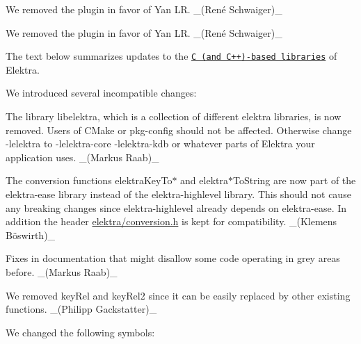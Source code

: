 \begin{DoxyItemize}
\item We removed the plugin in favor of Yan LR. \+\_\+(René Schwaiger)\+\_\+
\end{DoxyItemize}


\begin{DoxyItemize}
\item We removed the plugin in favor of Yan LR. \+\_\+(René Schwaiger)\+\_\+
\end{DoxyItemize}

The text below summarizes updates to the \href{https://www.libelektra.org/libraries/readme}{\tt C (and C++)-\/based libraries} of Elektra.

We introduced several incompatible changes\+:


\begin{DoxyItemize}
\item The library {\ttfamily libelektra}, which is a collection of different elektra libraries, is now removed. Users of C\+Make or pkg-\/config should not be affected. Otherwise change {\ttfamily -\/lelektra} to {\ttfamily -\/lelektra-\/core -\/lelektra-\/kdb} or whatever parts of Elektra your application uses. \+\_\+(\+Markus Raab)\+\_\+
\item The conversion functions {\ttfamily elektra\+Key\+To$\ast$} and {\ttfamily elektra$\ast$\+To\+String} are now part of the {\ttfamily elektra-\/ease} library instead of the {\ttfamily elektra-\/highlevel} library. This should not cause any breaking changes since {\ttfamily elektra-\/highlevel} already depends on {\ttfamily elektra-\/ease}. In addition the header {\ttfamily \hyperlink{conversion_8h}{elektra/conversion.\+h}} is kept for compatibility. \+\_\+(Klemens Böswirth)\+\_\+
\item Fixes in documentation that might disallow some code operating in grey areas before. \+\_\+(\+Markus Raab)\+\_\+
\item We removed {\ttfamily key\+Rel} and {\ttfamily key\+Rel2} since it can be easily replaced by other existing functions. \+\_\+(\+Philipp Gackstatter)\+\_\+
\end{DoxyItemize}

We changed the following symbols\+:


